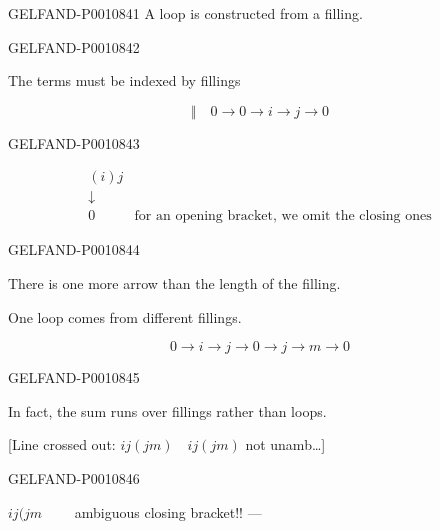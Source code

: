 \begin{GelfandAdjacentEvidence}{GELFAND-P001084}{1}
A loop is constructed from a filling.

\end{GelfandAdjacentEvidence}
\begin{GelfandAdjacentEvidence}{GELFAND-P001084}{2}

The terms must be indexed by fillings

\[
\Vert\quad 0\longrightarrow 0\longrightarrow i\longrightarrow j\longrightarrow 0
\]
\end{GelfandAdjacentEvidence}
\begin{GelfandAdjacentEvidence}{GELFAND-P001084}{3}


\[
\begin{array}{cl}
(i)j & \\
\downarrow & \\
0 & \text{for an opening bracket, we omit the closing ones}
\end{array}
\]
\end{GelfandAdjacentEvidence}
\begin{GelfandAdjacentEvidence}{GELFAND-P001084}{4}


There is one more arrow than the length of the filling.

One loop comes from different fillings.

\[
0\longrightarrow i\longrightarrow j\longrightarrow 0
\longrightarrow j\longrightarrow m\longrightarrow 0
\]
\end{GelfandAdjacentEvidence}
\begin{GelfandAdjacentEvidence}{GELFAND-P001084}{5}


In fact, the sum runs over fillings rather than loops.

[Line crossed out: $ij(jm)\quad ij(jm)$ not unamb…]
\end{GelfandAdjacentEvidence}
\begin{GelfandAdjacentEvidence}{GELFAND-P001084}{6}


$ij(jm\qquad$ ambiguous closing bracket!! —
\end{GelfandAdjacentEvidence}

